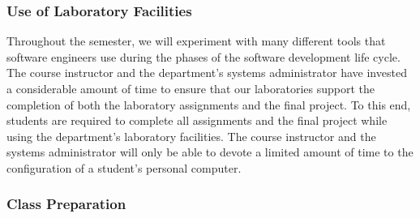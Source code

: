 % 
% 

\subsubsection*{Use of Laboratory Facilities}

Throughout the semester, we will experiment with many different tools that software engineers use during the phases of
the software development life cycle.  The course instructor and the department's systems administrator have invested a
considerable amount of time to ensure that our laboratories support the completion of both the laboratory assignments and the
final project.  To this end, students are required to complete all assignments and the final project while using the
department's laboratory facilities. The course instructor and the systems administrator will only be able to devote a
limited amount of time to the configuration of a student's personal computer.

\subsubsection*{Class Preparation}

% 

